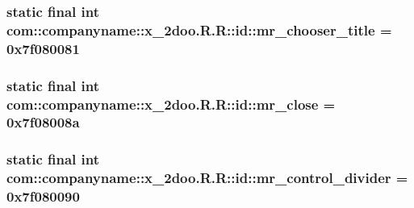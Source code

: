 \hypertarget{classcom_1_1companyname_1_1x__2doo_1_1_r_1_1id_bbd9921f2314adf7a259a59fd668cfb8}{
\subsubsection[{mr\_\-chooser\_\-title}]{\setlength{\rightskip}{0pt plus 5cm}static final int com::companyname::x\_\-2doo.R.R::id::mr\_\-chooser\_\-title = 0x7f080081}}
\label{classcom_1_1companyname_1_1x__2doo_1_1_r_1_1id_bbd9921f2314adf7a259a59fd668cfb8}


\hypertarget{classcom_1_1companyname_1_1x__2doo_1_1_r_1_1id_571c91afc9126c091d61a136a956f194}{
\subsubsection[{mr\_\-close}]{\setlength{\rightskip}{0pt plus 5cm}static final int com::companyname::x\_\-2doo.R.R::id::mr\_\-close = 0x7f08008a}}
\label{classcom_1_1companyname_1_1x__2doo_1_1_r_1_1id_571c91afc9126c091d61a136a956f194}


\hypertarget{classcom_1_1companyname_1_1x__2doo_1_1_r_1_1id_699e1a8ddd052cacfdf7854312687515}{
\subsubsection[{mr\_\-control\_\-divider}]{\setlength{\rightskip}{0pt plus 5cm}static final int com::companyname::x\_\-2doo.R.R::id::mr\_\-control\_\-divider = 0x7f080090}}
\label{classcom_1_1companyname_1_1x__2doo_1_1_r_1_1id_699e1a8ddd052cacfdf7854312687515}


